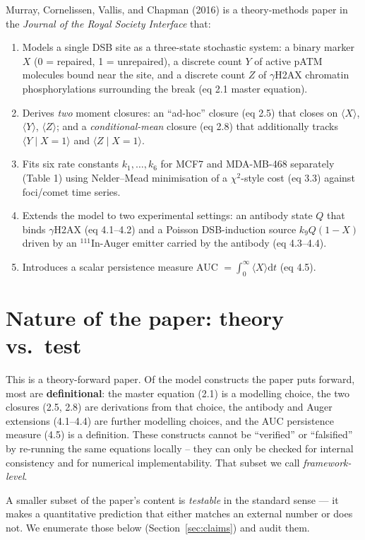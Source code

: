 \documentclass[11pt]{article}
\begin{document}
Murray, Cornelissen, Vallis, and Chapman (2016) is a theory-methods paper in the
\emph{Journal of the Royal Society Interface} that:
\begin{enumerate}
    \item Models a single DSB site as a three-state stochastic system: a binary marker $X$
      (0 = repaired, 1 = unrepaired), a discrete count $Y$ of active pATM molecules bound near
      the site, and a discrete count $Z$ of $\gamma$H2AX chromatin phosphorylations
      surrounding the break (eq 2.1 master equation).
    \item Derives \emph{two} moment closures: an ``ad-hoc'' closure (eq 2.5) that closes on
      $\langle X \rangle$, $\langle Y \rangle$, $\langle Z \rangle$; and a
      \emph{conditional-mean} closure (eq 2.8) that additionally tracks
      $\langle Y \mid X{=}1 \rangle$ and $\langle Z \mid X{=}1 \rangle$.
    \item Fits six rate constants $k_1,\ldots,k_6$ for MCF7 and MDA-MB-468 separately (Table 1) using
      Nelder--Mead minimisation of a $\chi^2$-style cost (eq 3.3) against foci/comet time series.
    \item Extends the model to two experimental settings: an antibody state $Q$ that binds
      $\gamma$H2AX (eq 4.1--4.2) and a Poisson DSB-induction source $k_9 Q(1-X)$ driven by
      an $^{111}$In-Auger emitter carried by the antibody (eq 4.3--4.4).
    \item Introduces a scalar persistence measure AUC $= \int_0^\infty \langle X \rangle \mathrm{d}t$
      (eq 4.5).
\end{enumerate}

\section{Nature of the paper: theory vs.\ test}

This is a theory-forward paper. Of the model constructs the paper puts forward, most are
\textbf{definitional}: the master equation (2.1) is a modelling choice, the two closures (2.5,
2.8) are derivations from that choice, the antibody and Auger extensions (4.1--4.4) are
further modelling choices, and the AUC persistence measure (4.5) is a definition. These
constructs cannot be ``verified'' or ``falsified'' by re-running the same equations locally --
they can only be checked for internal consistency and for numerical implementability. That
subset we call \emph{framework-level}.

A smaller subset of the paper's content is \emph{testable} in the standard sense --- it makes
a quantitative prediction that either matches an external number or does not. We enumerate
those below (Section~\ref{sec:claims}) and audit them.
\end{document}
